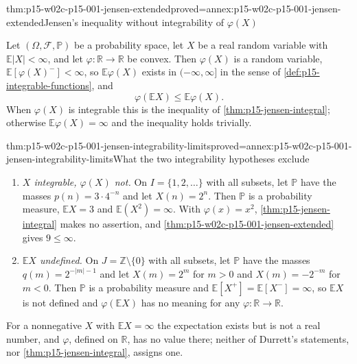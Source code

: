 \begin{hbtheorem}{thm:p15-w02c-p15-001-jensen-extended}{proved=annex:p15-w02c-p15-001-jensen-extended}{Jensen's inequality without integrability of \(\varphi(X)\)}
\par\nobreak
Let \((\Omega,\mathcal F,\mathbb P)\) be a probability space, let
\(X\) be a real random variable with \(\mathbb E|X|<\infty\), and let
\(\varphi:\mathbb R\to\mathbb R\) be convex. Then \(\varphi(X)\) is a
random variable, \(\mathbb E[\varphi(X)^-]<\infty\), so
\(\mathbb E\varphi(X)\) exists in \((-\infty,\infty]\) in the sense of
\cref{def:p15-integrable-functions}, and
\[
 \varphi(\mathbb EX)\leq\mathbb E\varphi(X).
\]
When \(\varphi(X)\) is integrable this is the inequality of
\cref{thm:p15-jensen-integral}; otherwise
\(\mathbb E\varphi(X)=\infty\) and the inequality holds trivially.
\end{hbtheorem}

\begin{hbtheorem}{thm:p15-w02c-p15-001-jensen-integrability-limits}{proved=annex:p15-w02c-p15-001-jensen-integrability-limits}{What the two integrability hypotheses exclude}
\par\nobreak
\begin{enumerate}
\item \emph{\(X\) integrable, \(\varphi(X)\) not.} On
      \(I=\{1,2,\ldots\}\) with all subsets, let \(\mathbb P\) have the
      masses \(p(n)=3\cdot4^{-n}\) and let \(X(n)=2^n\). Then
      \(\mathbb P\) is a probability measure,
      \(\mathbb EX=3\) and \(\mathbb E(X^2)=\infty\). With
      \(\varphi(x)=x^2\), \cref{thm:p15-jensen-integral} makes no
      assertion, and \cref{thm:p15-w02c-p15-001-jensen-extended} gives
      \(9\leq\infty\).
\item \emph{\(\mathbb EX\) undefined.} On
      \(J=\mathbb Z\setminus\{0\}\) with all subsets, let \(\mathbb P\)
      have the masses \(q(m)=2^{-|m|-1}\) and let
      \(X(m)=2^m\) for \(m>0\) and \(X(m)=-2^{-m}\) for \(m<0\). Then
      \(\mathbb P\) is a probability measure and
      \(\mathbb E[X^+]=\mathbb E[X^-]=\infty\), so \(\mathbb EX\) is
      not defined and \(\varphi(\mathbb EX)\) has no meaning for any
      \(\varphi:\mathbb R\to\mathbb R\).
\end{enumerate}
\end{hbtheorem}

For a nonnegative \(X\) with \(\mathbb EX=\infty\) the expectation exists
but is not a real number, and \(\varphi\), defined on \(\mathbb R\), has
no value there; neither of Durrett's statements, nor
\cref{thm:p15-jensen-integral}, assigns one.

